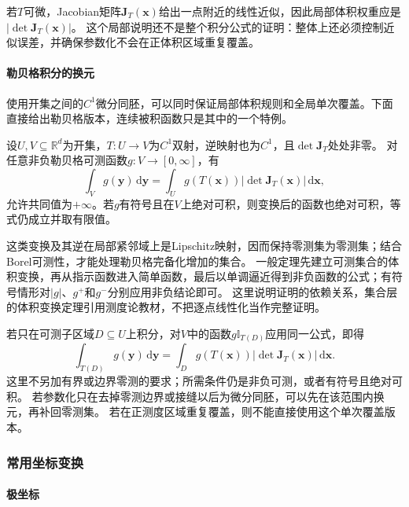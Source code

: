 若$T$可微，Jacobian矩阵$\bm J_T(\bm x)$给出一点附近的线性近似，因此局部体积权重应是$|\det\bm J_T(\bm x)|$。
这个局部说明还不是整个积分公式的证明：整体上还必须控制近似误差，并确保参数化不会在正体积区域重复覆盖。

\paragraph{勒贝格积分的换元}

使用开集之间的$C^1$微分同胚，可以同时保证局部体积规则和全局单次覆盖。下面直接给出勒贝格版本，连续被积函数只是其中的一个特例。
\begin{theorem}[区域积分的换元公式]
设$U,V\subseteq\mathbb R^d$为开集，$T:U\to V$为$C^1$双射，逆映射也为$C^1$，且$\det\bm J_T$处处非零。
对任意非负勒贝格可测函数$g:V\to[0,\infty]$，有
\begin{equation}
 \int_Vg(\bm y)\,\mathrm d\bm y
 =\int_Ug(T(\bm x))|\det\bm J_T(\bm x)|\,\mathrm d\bm x,
 \label{eq:measurable-change-variables}
\end{equation}
允许共同值为$+\infty$。若$g$有符号且在$V$上绝对可积，则变换后的函数也绝对可积，等式仍成立并取有限值。
\end{theorem}

这类变换及其逆在局部紧邻域上是Lipschitz映射，因而保持零测集为零测集；结合Borel可测性，才能处理勒贝格完备化增加的集合。
一般定理先建立可测集合的体积变换，再从指示函数进入简单函数，最后以单调逼近得到非负函数的公式；有符号情形对$|g|$、$g^+$和$g^-$分别应用非负结论即可。
这里说明证明的依赖关系，集合层的体积变换定理引用测度论教材，不把逐点线性化当作完整证明。

若只在可测子区域$D\subseteq U$上积分，对$V$中的函数$g\mathbb I_{T(D)}$应用同一公式，即得
\begin{equation}
 \int_{T(D)}g(\bm y)\,\mathrm d\bm y
 =\int_Dg(T(\bm x))|\det\bm J_T(\bm x)|\,\mathrm d\bm x.
 \label{eq:analysis-multivariate-change-variables}
\end{equation}
这里不另加有界或边界零测的要求；所需条件仍是非负可测，或者有符号且绝对可积。
若参数化只在去掉零测边界或接缝以后为微分同胚，可以先在该范围内换元，再补回零测集。
若在正测度区域重复覆盖，则不能直接使用这个单次覆盖版本。

\subsubsection{常用坐标变换}

\paragraph{极坐标}

